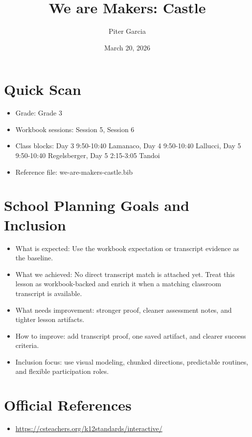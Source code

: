 \documentclass[11pt]{article}
\title{We are Makers: Castle}
\author{Piter Garcia}
\date{March 20, 2026}
\begin{document}
\maketitle
\section*{Quick Scan}
\begin{itemize}[leftmargin=*]
\item Grade: Grade 3
\item Workbook sessions: Session 5, Session 6
\item Class blocks: Day 3 9:50-10:40 Lamanaco, Day 4 9:50-10:40 Lallucci, Day 5 9:50-10:40 Regelsberger, Day 5 2:15-3:05 Tandoi
\item Reference file: we-are-makers-castle.bib
\end{itemize}
\section*{School Planning Goals and Inclusion}
\begin{itemize}[leftmargin=*]
\item What is expected: Use the workbook expectation or transcript evidence as the baseline.
\item What we achieved: No direct transcript match is attached yet. Treat this lesson as workbook-backed and enrich it when a matching classroom transcript is available.
\item What needs improvement: stronger proof, cleaner assessment notes, and tighter lesson artifacts.
\item How to improve: add transcript proof, one saved artifact, and clearer success criteria.
\item Inclusion focus: use visual modeling, chunked directions, predictable routines, and flexible participation roles.
\end{itemize}
\section*{Official References}
\begin{itemize}[leftmargin=*]
\item \url{https://csteachers.org/k12standards/interactive/}

\end{itemize}
\end{document}
